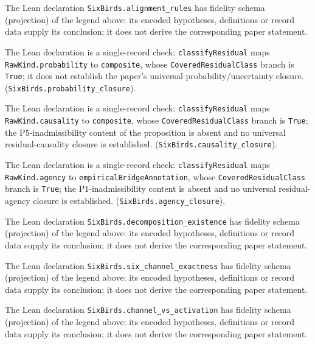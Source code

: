 \documentclass[11pt]{article}
\theoremstyle{definition}
\newcommand{\Pone}{\ensuremath{\mathrm{P1}}}
\newcommand{\Pfive}{\ensuremath{\mathrm{P5}}}
\begin{document}
\begin{description}[style=unboxed,leftmargin=0pt,itemsep=3pt]
  \item[Proposition~\ref{prop:alignment-rules}.] The Lean declaration \texttt{SixBirds.alignment\_rules} has fidelity schema (projection) of the legend above: its encoded hypotheses, definitions or record data supply its conclusion; it does not derive the corresponding paper statement.
  \item[Proposition~\ref{prop:probability-closure}.] The Lean declaration is a single-record check: \texttt{classifyResidual} maps \texttt{RawKind.probability} to \texttt{composite}, whose \texttt{CoveredResidualClass} branch is \texttt{True}; it does not establish the paper's universal probability/uncertainty closure. (\texttt{SixBirds.probability\_closure}).
  \item[Proposition~\ref{prop:causality-closure}.] The Lean declaration is a single-record check: \texttt{classifyResidual} maps \texttt{RawKind.causality} to \texttt{composite}, whose \texttt{CoveredResidualClass} branch is \texttt{True}; the \Pfive{}-inadmissibility content of the proposition is absent and no universal residual-causality closure is established. (\texttt{SixBirds.causality\_closure}).
  \item[Proposition~\ref{prop:agency-closure}.] The Lean declaration is a single-record check: \texttt{classifyResidual} maps \texttt{RawKind.agency} to \texttt{empiricalBridgeAnnotation}, whose \texttt{CoveredResidualClass} branch is \texttt{True}; the \Pone{}-inadmissibility content is absent and no universal residual-agency closure is established. (\texttt{SixBirds.agency\_closure}).
  \item[Theorem~\ref{thm:decomposition-existence}.] The Lean declaration \texttt{SixBirds.decomposition\_existence} has fidelity schema (projection) of the legend above: its encoded hypotheses, definitions or record data supply its conclusion; it does not derive the corresponding paper statement.
  \item[Theorem~\ref{thm:six-channel-exactness}.] The Lean declaration \texttt{SixBirds.six\_channel\_exactness} has fidelity schema (projection) of the legend above: its encoded hypotheses, definitions or record data supply its conclusion; it does not derive the corresponding paper statement.
  \item[Proposition~\ref{prop:channel-vs-activation}.] The Lean declaration \texttt{SixBirds.channel\_vs\_activation} has fidelity schema (projection) of the legend above: its encoded hypotheses, definitions or record data supply its conclusion; it does not derive the corresponding paper statement.

\end{description}
\end{document}
